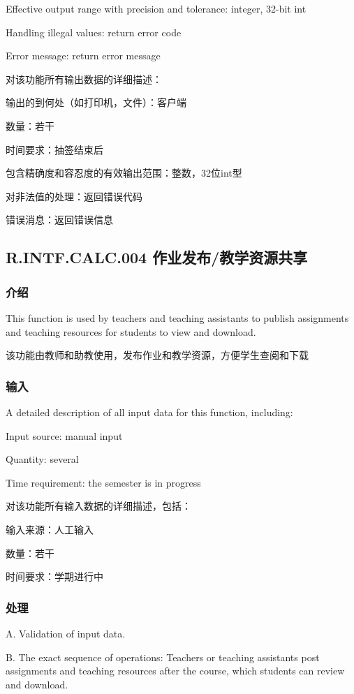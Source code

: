 Effective output range with precision and tolerance: integer, 32-bit int

Handling illegal values: return error code

Error message: return error message

对该功能所有输出数据的详细描述：

	输出的到何处（如打印机，文件）：客户端

	数量：若干

	时间要求：抽签结束后

	包含精确度和容忍度的有效输出范围：整数，32位int型

	对非法值的处理：返回错误代码

	错误消息：返回错误信息
		

\subsection{R.INTF.CALC.004 作业发布/教学资源共享}
\subsubsection{介绍}
This function is used by teachers and teaching assistants to publish assignments and teaching resources for students to view and download.

该功能由教师和助教使用，发布作业和教学资源，方便学生查阅和下载

\subsubsection{输入}
A detailed description of all input data for this function, including:

Input source: manual input

Quantity: several

Time requirement: the semester is in progress

对该功能所有输入数据的详细描述，包括：

	输入来源：人工输入

	数量：若干

	时间要求：学期进行中
		
\subsubsection{处理}

A. Validation of input data.

B. The exact sequence of operations: Teachers or teaching assistants post assignments and teaching resources after the course, which students can review and download.

